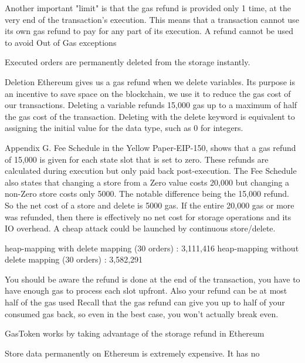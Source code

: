 Another important "limit" is that the gas refund is provided only 1 time, at the very end of the transaction's execution.
This means that a transaction cannot use its own gas refund to pay for any part of its execution.
A refund cannot be used to avoid Out of Gas exceptions








Executed orders are permanently deleted from the storage instantly. 



Deletion
Ethereum gives us a gas refund when we delete variables. Its purpose is an incentive to save space on the blockchain, we use it to reduce the gas cost of our transactions.
Deleting a variable refunds 15,000 gas up to a maximum of half the gas cost of the transaction. Deleting with the delete keyword is equivalent to assigning the initial value for the data type, such as 0 for integers.





Appendix G. Fee Schedule in the Yellow Paper-EIP-150, shows that a gas refund of 15,000 is given for each state slot that is set to zero. These refunds are calculated during execution but only paid back post-execution.
The Fee Schedule also states that changing a store from a Zero value costs 20,000 but changing a non-Zero store costs only 5000. The notable difference being the 15,000 refund.
So the net cost of a store and delete is 5000 gas. If the entire 20,000 gas or more was refunded, then there is effectively no net cost for storage operations and its IO overhead. A cheap attack could be launched by continuous store/delete.

heap-mapping with delete mapping (30 orders) : 3,111,416
heap-mapping without delete mapping (30 orders) : 3,582,291


You should be aware the refund is done at the end of the transaction, you have to have enough gas to process each slot upfront. Also your refund can be at most half of the gas used
Recall that the gas refund can give you up to half of your consumed gas back, so even in the best case, you won't actually break even.

GasToken works by taking advantage of the storage refund in Ethereum

Store data permanently on Ethereum is extremely expensive. It has no 

